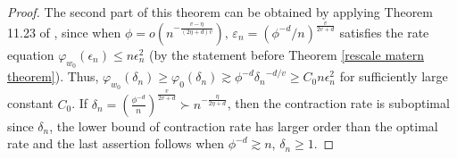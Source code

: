 \documentclass[ejs,noshowframe]{imsart}
\theoremstyle{plain}
\theoremstyle{definition}
\theoremstyle{remark}
\begin{document}
\begin{appendix}
\begin{proof}
The second part of this theorem can be obtained by applying Theorem 11.23 of 
 \cite{ghosal2017fundamentals}, since  when  $\phi=o(n^{-\frac{v-\eta}{(2\eta+d)v}}),\,\varepsilon_n=
   \left( {\phi^{-d}}/{n}\right)^{\frac{v}{2v+d}}$ satisfies the rate equation $\varphi_{w_0}(\epsilon_n) \le n \epsilon_n^2$ (by the statement before Theorem \ref{rescale matern theorem}). Thus, $\varphi_{w_0}(\delta_n) \ge \varphi_0(\delta_n) \gtrsim \phi^{-d} {\delta_n}^{-d/v} \ge C_0 n\epsilon_n^2$ for sufficiently large constant $C_0$. If $\delta_n=(\frac{\phi^{-d}}{n})^{\frac{v}{2v+d}} \succ n^{-\frac{\eta}{2\eta+d}}$, then the contraction rate is suboptimal since $\delta_n$, the lower bound of contraction rate   has larger order than the optimal rate and the last assertion follows when $\phi^{-d} \gtrsim n$, $\delta_n \ge 1$.
\end{proof}


\end{appendix}
\end{document}
